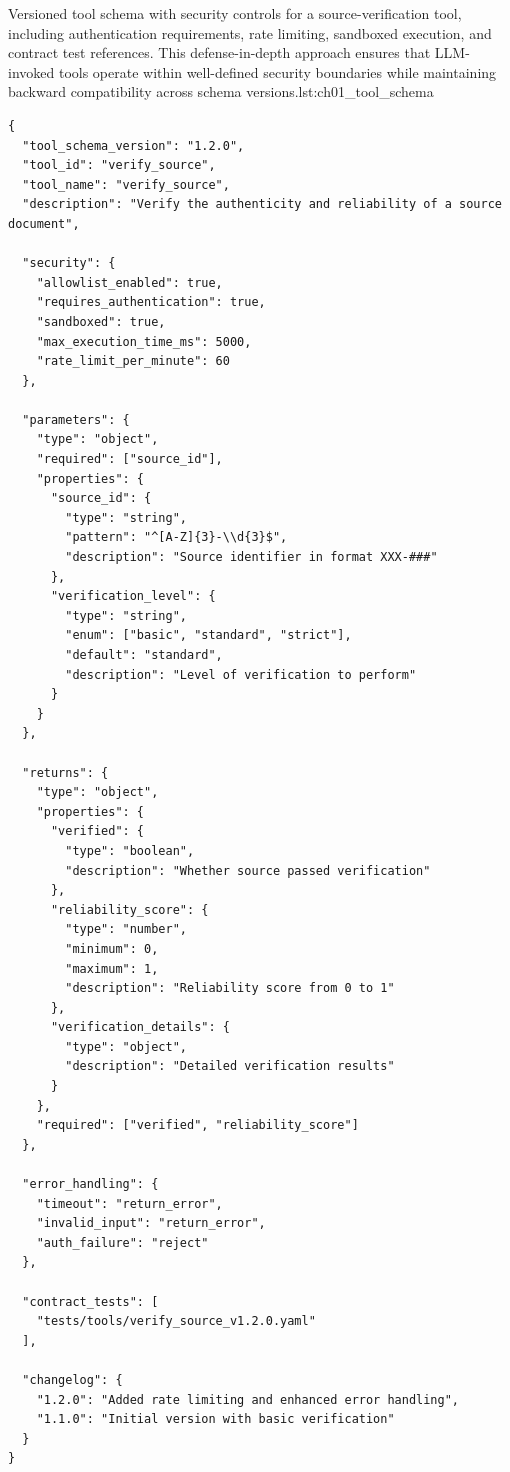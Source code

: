 \begin{codebox}{Versioned tool schema with security controls for a source-verification tool, including authentication requirements, rate limiting, sandboxed execution, and contract test references. This defense-in-depth approach ensures that LLM-invoked tools operate within well-defined security boundaries while maintaining backward compatibility across schema versions.}{lst:ch01_tool_schema}
\begin{verbatim}
{
  "tool_schema_version": "1.2.0",
  "tool_id": "verify_source",
  "tool_name": "verify_source",
  "description": "Verify the authenticity and reliability of a source document",

  "security": {
    "allowlist_enabled": true,
    "requires_authentication": true,
    "sandboxed": true,
    "max_execution_time_ms": 5000,
    "rate_limit_per_minute": 60
  },

  "parameters": {
    "type": "object",
    "required": ["source_id"],
    "properties": {
      "source_id": {
        "type": "string",
        "pattern": "^[A-Z]{3}-\\d{3}$",
        "description": "Source identifier in format XXX-###"
      },
      "verification_level": {
        "type": "string",
        "enum": ["basic", "standard", "strict"],
        "default": "standard",
        "description": "Level of verification to perform"
      }
    }
  },

  "returns": {
    "type": "object",
    "properties": {
      "verified": {
        "type": "boolean",
        "description": "Whether source passed verification"
      },
      "reliability_score": {
        "type": "number",
        "minimum": 0,
        "maximum": 1,
        "description": "Reliability score from 0 to 1"
      },
      "verification_details": {
        "type": "object",
        "description": "Detailed verification results"
      }
    },
    "required": ["verified", "reliability_score"]
  },

  "error_handling": {
    "timeout": "return_error",
    "invalid_input": "return_error",
    "auth_failure": "reject"
  },

  "contract_tests": [
    "tests/tools/verify_source_v1.2.0.yaml"
  ],

  "changelog": {
    "1.2.0": "Added rate limiting and enhanced error handling",
    "1.1.0": "Initial version with basic verification"
  }
}
\end{verbatim}
\end{codebox}

